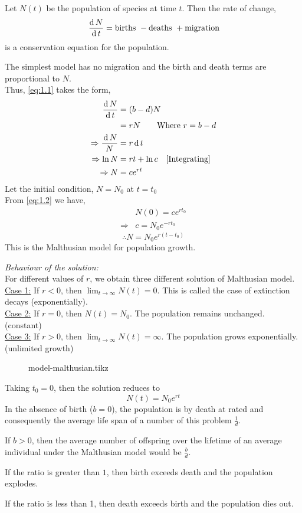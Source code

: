 \documentclass[../main-sheet.tex]{subfiles}
\begin{document}
\begin{soln}
    Let \(N(t)\) be the population of species at time \(t\). Then the rate of change,
    \begin{equation}
        \,\frac{\mathrm{d}\,N}{\mathrm{d}\,t}=\text{births }-\text{deaths }+\text{migration}
        \label{eq:1.1}
    \end{equation}
    is a conservation equation for the population.

    The simplest model has no migration and the birth and death terms are proportional to \(N\).\\
    Thus, \eqref{eq:1.1} takes the form,
    \begin{align}
        \,\frac{\mathrm{d}\,N}{\mathrm{d}\,t}&=(b-d)N\notag\\
        &=rN\qquad\text{Where } r=b-d\notag\\
       \Rightarrow \frac{\,\mathrm{d}\, N}{N}&=r\,\mathrm{d}\, t\notag\\
       \Rightarrow\ln N&=rt+\ln c\quad [\text{Integrating}]\notag\\
       \Rightarrow N&=c e^{rt}\label{eq:1.2}
    \end{align}
    Let the initial condition, \(N=N_0\) at \(t=t_0\)\\
    From \eqref{eq:1.2} we have,
    \begin{align*}
        &N(0)=ce^{rt_0}\\
        \Rightarrow &c=N_0 e^{-rt_0}
    \end{align*}
        \[\therefore N=N_0 e^{r(t-t_0)}\]
    This is the Malthusian model for population growth.

    \emph{Behaviour of the solution:}\\
    For different values of \(r\), we obtain three different solution of Malthusian model.\\


    \underline{Case 1:} If \(r<0\), then \(\lim_{t\to\infty}N(t)=0\). This is called the case of extinction decays (exponentially).\\
    
    
    \underline{Case 2:} If \(r=0\), then \(N(t)=N_0\). The population remains unchanged. (constant)\\


    \underline{Case 3:} If \(r>0\), then \(\lim_{t\to\infty}N(t)=\infty\). The population grows exponentially. (unlimited growth)
    \begin{figure}[H]
        \centering
        {model-malthusian.tikz}
    \end{figure}
    Taking \(t_0=0\), then the solution reduces to
    \[N(t)=N_0e^{rt}\]
    In the absence of birth (\(b=0\)), the population is by death at rated and consequently the average life span of a number of this problem \(\frac{1}{d}\).
    
    If \(b>0\), then the average number of offspring over the lifetime of an average individual under the Malthusian model would be \(\frac{b}{d}\).
    
    If the ratio is greater than \(1\), then birth exceeds death and the population explodes.
    
    If the ratio is less than 1, then death exceeds birth and the population dies out.
\end{soln}
\end{document}
